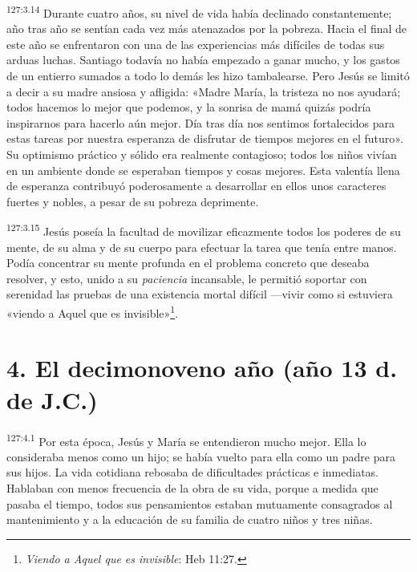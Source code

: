 \par
\textsuperscript{127:3.14} Durante cuatro años, su nivel de vida había declinado constantemente; año tras año se sentían cada vez más atenazados por la pobreza. Hacia el final de este año se enfrentaron con una de las experiencias más difíciles de todas sus arduas luchas. Santiago todavía no había empezado a ganar mucho, y los gastos de un entierro sumados a todo lo demás les hizo tambalearse. Pero Jesús se limitó a decir a su madre ansiosa y afligida: «Madre María, la tristeza no nos ayudará; todos hacemos lo mejor que podemos, y la sonrisa de mamá quizás podría inspirarnos para hacerlo aún mejor. Día tras día nos sentimos fortalecidos para estas tareas por nuestra esperanza de disfrutar de tiempos mejores en el futuro». Su optimismo práctico y sólido era realmente contagioso; todos los niños vivían en un ambiente donde se esperaban tiempos y cosas mejores. Esta valentía llena de esperanza contribuyó poderosamente a desarrollar en ellos unos caracteres fuertes y nobles, a pesar de su pobreza deprimente.

\par
\textsuperscript{127:3.15} Jesús poseía la facultad de movilizar eficazmente todos los poderes de su mente, de su alma y de su cuerpo para efectuar la tarea que tenía entre manos. Podía concentrar su mente profunda en el problema concreto que deseaba resolver, y esto, unido a su \textit{paciencia} incansable, le permitió soportar con serenidad las pruebas de una existencia mortal difícil ---vivir como si estuviera «viendo a Aquel que es invisible»\footnote{\textit{Viendo a Aquel que es invisible}: Heb 11:27.}.

\section*{4. El decimonoveno año (año 13 d. de J.C.)}
\par
\textsuperscript{127:4.1} Por esta época, Jesús y María se entendieron mucho mejor. Ella lo consideraba menos como un hijo; se había vuelto para ella como un padre para sus hijos. La vida cotidiana rebosaba de dificultades prácticas e inmediatas. Hablaban con menos frecuencia de la obra de su vida, porque a medida que pasaba el tiempo, todos sus pensamientos estaban mutuamente consagrados al mantenimiento y a la educación de su familia de cuatro niños y tres niñas.

